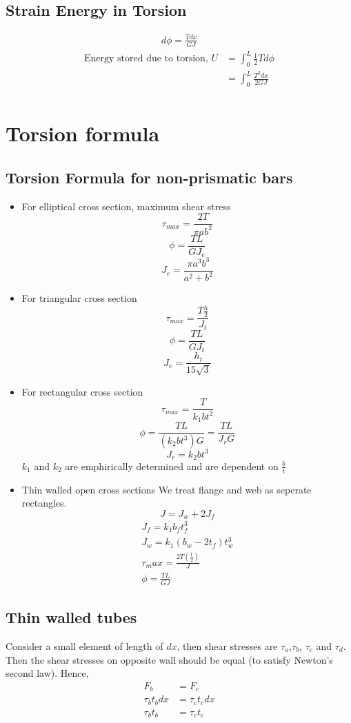 \documentclass{article}
\begin{document}
	\subsection{Strain Energy in Torsion}
	\begin{gather*}
		d\phi = \frac{T dx}{GJ}
	\end{gather*}
	\begin{align*}
		\text{Energy stored due to torsion, } U &= \int_0^L \frac{1}{2} T d\phi\\
											    &= \int_0^L \frac{T^2 dx}{2GJ} \\
	\end{align*}


\section{Torsion formula}
	\subsection{Torsion Formula for non-prismatic bars}
	\begin{itemize}
	\item For elliptical cross section, maximum shear stress
		\[\tau_{max} = \frac{2T}{\pi ab^2}\]
		\[\phi = \frac{TL}{GJ_e}\]
		\[J_e = \frac{\pi a^3 b^3}{a^2 + b^2}\]


	\item For triangular cross section
		\[\tau_{max} = \frac{T \frac{h}{2}}{J_t}\]
		\[\phi = \frac{TL}{GJ_t}\]
		\[J_e = \frac{h_t}{15\sqrt{3}}\]

	\item For rectangular cross section
		\[\tau_{max} = \frac{T}{k_1 b t^2}\]
		\[\phi = \frac{TL}{(k_2bt^3)G}= \frac{TL}{J_rG}\]
		\[J_r = k_2 b t^3\]
		$k_1$ and $k_2$ are emphirically determined and are dependent on $\frac{b}{t}$

	\item Thin walled open cross sections
	We treat flange and web as seperate rectangles.
		\[J = J_w + 2J_f\]
		\begin{gather*}
		J_f = k_1 b_f t_f^3 \\
		J_w = k_1 (b_w-2t_f) t_w^3\\
		\tau_max = \frac{2T (\frac{t}{2})}{J}\\
		\phi = \frac{TL}{GJ}
		\end{gather*}
	\end{itemize}

	\subsection{Thin walled tubes}
		Consider a small element of length of $dx$, then shear stresses are $\tau_a$,$\tau_b$, $\tau_c$ and $\tau_d$. Then the shear stresses on opposite wall should be equal (to satisfy Newton's second law). Hence,
		\begin{align*}
			F_b &= F_c\\
			\tau_b t_b dx &= \tau_c t_c dx\\
			\tau_b t_b &= \tau_c t_c
		\end{align*}
\end{document}
